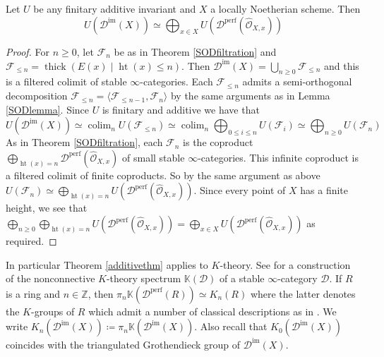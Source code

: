 \documentclass[12pt,oneside]{amsart}
\DeclareMathOperator*{\colim}{colim}
\DeclareMathOperator{\thick}{thick}
\DeclareMathOperator{\perf}{perf}
\DeclareMathOperator{\immac}{im}
\DeclareMathOperator{\hgt}{ht}
\begin{document}
\begin{theorem} \label{additivethm}
Let $U$ be any finitary additive invariant and $X$ a locally Noetherian scheme. Then 
\[
U(\mathcal{D}^{\immac}(X)) \simeq \bigoplus_{x \in X} U(\mathcal{D}^{\perf}(\widehat{\mathcal{O}}_{X,x}))
\]
\end{theorem}

\begin{proof}
For $n \geq 0$, let $\mathcal{F}_{n}$ be as in Theorem \ref{SODfiltration} and $\mathcal{F}_{\leq n} = \thick(E(x) \mid \hgt(x) \leq n)$. Then $\mathcal{D}^{\immac}(X) = \bigcup_{n \geq 0} \mathcal{F}_{\leq n}$ and this is a filtered colimit of stable $\infty$-categories. Each $\mathcal{F}_{\leq n}$ admits a semi-orthogonal decomposition $\mathcal{F}_{\leq n} = \langle \mathcal{F}_{\leq n-1}, \mathcal{F}_n\rangle$ by the same arguments as in Lemma \ref{SODlemma}. Since $U$ is finitary and additive we have that
\[
U(\mathcal{D}^{\immac}(X)) \simeq \colim_n U(\mathcal{F}_{\leq n}) \simeq \colim_n \bigoplus_{0 \leq i \leq n} U(\mathcal{F}_i) \simeq \bigoplus_{n \geq 0} U(\mathcal{F}_n)
\]
As in Theorem \ref{SODfiltration}, each $\mathcal{F}_n$ is the coproduct $\bigoplus_{\hgt(x) = n} \mathcal{D}^{\perf}(\widehat{\mathcal{O}}_{X,x})$ of small stable $\infty$-categories. This infinite coproduct is a filtered colimit of finite coproducts. So by the same argument as above $U(\mathcal{F}_n) \simeq \bigoplus_{\hgt(x) = n} U(\mathcal{D}^{\perf}(\widehat{\mathcal{O}}_{X,x}))$. Since every point of $X$ has a finite height, we see that $\bigoplus_{n \geq 0} \bigoplus_{\hgt(x) = n} U(\mathcal{D}^{\perf}(\widehat{\mathcal{O}}_{X,x})) = \bigoplus_{x \in X} U(\mathcal{D}^{\perf}(\widehat{\mathcal{O}}_{X,x}))$ as required.
\end{proof}


\begin{remark}  \label{Kremark}
In particular Theorem \ref{additivethm} applies to $K$-theory. See \cite[Section 9]{BGT13} for a construction of the nonconnective $K$-theory spectrum $\mathbb{K}(\mathcal{D})$ of a stable $\infty$-category $\mathcal{D}$. If $R$ is a ring and $n \in \mathbb{Z}$, then $\pi_n\mathbb{K}(\mathcal{D}^{\perf}(R)) \simeq K_n(R)$ where the latter denotes the $K$-groups of $R$ which admit a number of classical descriptions as in \cite{Wei13}. We write $K_n(\mathcal{D}^{\immac}(X)) \coloneq \pi_n \mathbb{K}(\mathcal{D}^{\immac}(X))$. Also recall that $K_0(\mathcal{D}^{\immac}(X))$ coincides with the triangulated Grothendieck group of $\mathcal{D}^{\immac}(X)$.
\end{remark}
\end{document}
